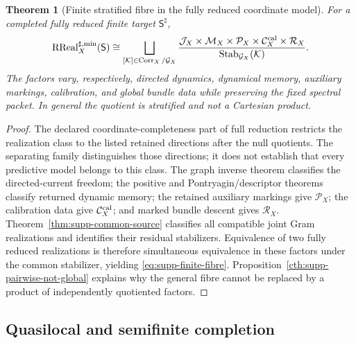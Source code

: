 \documentclass[11pt]{article}
\newtheorem{theorem}{Theorem}[section]
\theoremstyle{definition}
\theoremstyle{remark}
\theoremstyle{definition}
\theoremstyle{remark}
\newcommand{\RReal}{\operatorname{RReal}}
\newcommand{\Corr}{\operatorname{Corr}}
\newcommand{\Stab}{\operatorname{Stab}}
\begin{document}
\begin{theorem}[Finite stratified fibre in the fully reduced coordinate model]
\label{thm:supp-finite-exhaustion}
For a completed fully reduced finite target $\mathsf S^\sharp$,
\begin{equation}
{
\RReal_X^{\sharp,\min}(\mathsf S)
\cong
\bigsqcup_{[\mathcal K]\in\Corr_X/\mathcal G_X}
\frac{
\mathcal J_X\times\mathcal M_X\times\mathcal P_X
\times\mathcal C_X^{\rm cal}\times\mathcal R_X
}{\Stab_{\mathcal G_X}(\mathcal K)}.}
\label{eq:supp-finite-fibre}
\end{equation}
The factors vary, respectively, directed dynamics, dynamical memory,
auxiliary markings, calibration, and global bundle data while preserving
the fixed spectral packet.  In general the quotient is stratified and not a
Cartesian product.
\end{theorem}

\begin{proof}
The declared coordinate-completeness part of full reduction restricts the
realization class to the listed retained directions after the null quotients.
The separating family distinguishes those directions; it does not establish
that every predictive model belongs to this class.  The graph inverse theorem classifies the directed-current freedom; the
positive and Pontryagin/descriptor theorems classify returned dynamic memory;
the retained auxiliary markings give $\mathcal P_X$; the calibration data give
$\mathcal C_X^{\rm cal}$; and marked bundle descent gives $\mathcal R_X$.
Theorem~\ref{thm:supp-common-source} classifies all compatible joint Gram
realizations and identifies their residual stabilizers.  Equivalence of two
fully reduced realizations is therefore simultaneous equivalence in these
factors under the common stabilizer, yielding \eqref{eq:supp-finite-fibre}.
Proposition~\ref{cth:supp-pairwise-not-global} explains why the general fibre
cannot be replaced by a product of independently quotiented factors.
\end{proof}

\subsection{Quasilocal and semifinite completion}
\end{document}
